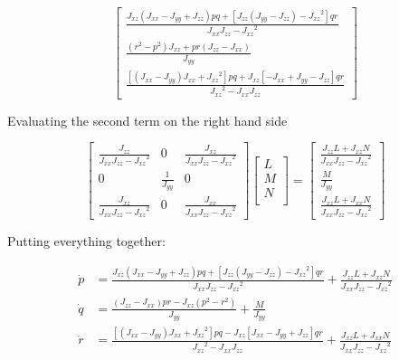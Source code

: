 \begin{equation*}
  \begin{bmatrix}
    \frac{J_{xz}(J_{xx}-J_{yy}+J_{zz})pq+[J_{zz}(J_{yy}-J_{zz})-{J_{xz}}^{2}]qr}{J_{xx}J_{zz}-{J_{xz}}^{2}} \\
    \frac{(r^{2}-p^{2})J_{xz}+pr(J_{zz}-J_{xx})}{J_{yy}} \\
    \frac{[(J_{xx}-J_{yy})J_{xx}+{J_{xz}}^{2}]pq+J_{xz}[-J_{xx}+J_{yy}-J_{zz}]qr}{{J_{xz}}^{2}-J_{xx}J_{zz}}
  \end{bmatrix}
\end{equation*}

Evaluating the second term on the right hand side

\begin{equation*}
  \begin{bmatrix}
    \frac{J_{zz}}{J_{xx}J_{zz}-{J_{xz}}^{2}} & 0 & \frac{J_{xz}}{J_{xx}J_{zz}-{J_{xz}}^{2}} \\
    0 & \frac{1}{J_{yy}} & 0 \\
    \frac{J_{xz}}{J_{xx}J_{zz}-{J_{xz}}^{2}} & 0 & \frac{J_{xx}}{J_{xx}J_{zz}-{J_{xz}}^{2}}
  \end{bmatrix}
  \begin{bmatrix}
    L \\
    M \\
    N \\
  \end{bmatrix}=
  \begin{bmatrix}
    \frac{J_{zz}L+J_{xz}N}{J_{xx}J_{zz}-{J_{xz}}^{2}} \\
    \frac{M}{J_{yy}} \\
    \frac{J_{xz}L+J_{xx}N}{J_{xx}J_{zz}-{J_{xz}}^{2}}
  \end{bmatrix}
\end{equation*}

Putting everything together:

\begin{equation}
  \label{ssmoment_eqn}
  \begin{split}
    \dot{p}&=\frac{J_{xz}(J_{xx}-J_{yy}+J_{zz})pq+[J_{zz}(J_{yy}-J_{zz})-{J_{xz}}^{2}]qr}{J_{xx}J_{zz}-{J_{xz}}^{2}}+
    \frac{J_{zz}L+J_{xz}N}{J_{xx}J_{zz}-{J_{xz}}^{2}} \\
    \dot{q}&=\frac{(J_{zz}-J_{xx})pr-J_{xz}(p^{2}-r^{2})}{J_{yy}}+
    \frac{M}{J_{yy}} \\
    \dot{r}&=\frac{[(J_{xx}-J_{yy})J_{xx}+{J_{xz}}^{2}]pq-J_{xz}[J_{xx}-J_{yy}+J_{zz}]qr}{{J_{xz}}^{2}-J_{xx}J_{zz}}+
    \frac{J_{xz}L+J_{xx}N}{J_{xx}J_{zz}-{J_{xz}}^{2}} \\
  \end{split}
\end{equation}

